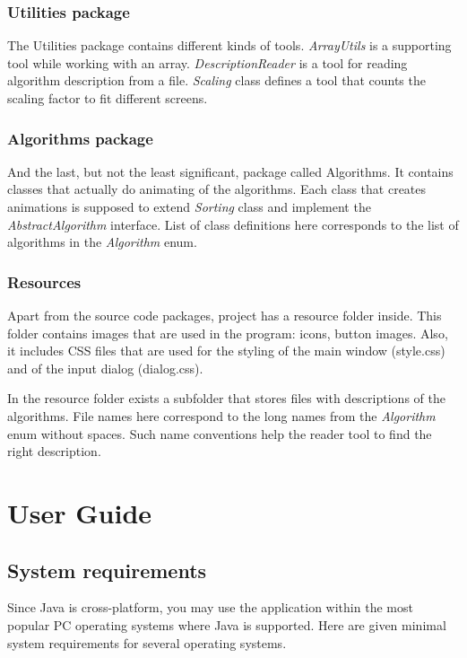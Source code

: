 \documentclass[
  field=inf,
  biblatex,
  language=english,
  glossaries,
  theorems=false,
  index
]{kidiplom}
\begin{document}
\subsubsection{Utilities package}
The Utilities package contains different kinds of tools. \textit{ArrayUtils} is a supporting tool while working with an array. \textit{DescriptionReader} is a tool for reading algorithm description from a file. \textit{Scaling} class defines a tool that counts the scaling factor to fit different screens.

\subsubsection{Algorithms package}
And the last, but not the least significant, package called Algorithms. It contains classes that actually do animating of the algorithms. Each class that creates animations is supposed to extend \textit{Sorting} class and implement the \textit{AbstractAlgorithm} interface. List of class definitions here corresponds to the list of algorithms in the \textit{Algorithm} enum.

\subsubsection{Resources}
Apart from the source code packages, project has a resource folder inside. This folder contains images that are used in the program: icons, button images. Also, it includes \Gls{CSS} files that are used for the styling of the main window (style.css) and of the input dialog (dialog.css).

In the resource folder exists a subfolder that stores files with descriptions of the algorithms. File names here correspond to the long names from the \textit{Algorithm} enum without spaces. Such name conventions help the reader tool to find the right description.

\newpage
\section{User Guide}

\subsection{System requirements}

Since Java is cross-platform, you may use the application within the most popular PC operating systems where Java is supported. Here are given minimal system requirements for several operating systems.
\end{document}
